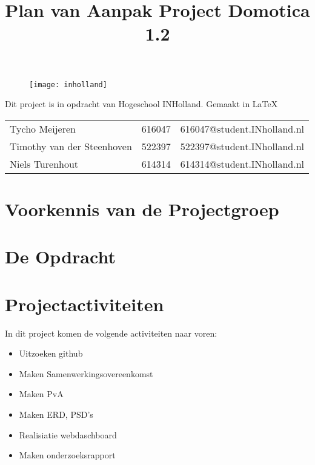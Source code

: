 \documentclass[11pt]{article}
\title{Plan van Aanpak Project Domotica 1.2}
\date{} %
\begin{document}
\thispagestyle{empty}
\maketitle %

\begin{figure}[h]
	\centering
	\texttt{[image: inholland]}
\end{figure}

\vspace{20mm} %

\center Dit project is in opdracht van Hogeschool INHolland. \center Gemaakt in \LaTeX 

	\vspace{10mm}

\begin{tabular} {l c c} %
	
	Tycho Meijeren & 616047& 616047@student.INholland.nl\\
	
	Timothy van der Steenhoven & 522397 & 522397@student.INholland.nl\\
	
	Niels Turenhout & 614314 & 614314@student.INholland.nl
\end{tabular}


\newpage

\tableofcontents
\thispagestyle{empty}

\newpage

\section[Voorkennis]{Voorkennis van de Projectgroep}
\newpage
\section{De Opdracht}
\newpage
\section{Projectactiviteiten}

\begin{flushleft}
	
	In dit project komen de volgende activiteiten naar voren:
	
	
	\begin{itemize}
		
		\item Uitzoeken github
		\item Maken Samenwerkingsovereenkomst
		\item Maken PvA
		\item Maken ERD, PSD's
		\item Realisiatie webdaschboard
		\item Maken onderzoeksrapport
	\end{itemize}
	
\end{flushleft}
\end{document}
